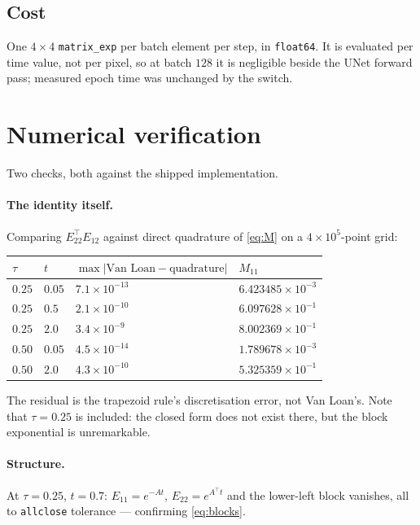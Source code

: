 \documentclass[11pt]{article}
\newcommand{\tauu}{\tau}
\begin{document}
\subsection{Cost}

One $4\times4$ \texttt{matrix\_exp} per batch element per step, in \texttt{float64}. It is
evaluated per time value, not per pixel, so at batch $128$ it is negligible beside the UNet
forward pass; measured epoch time was unchanged by the switch.

\section{Numerical verification}

Two checks, both against the shipped implementation.

\paragraph{The identity itself.} Comparing $E_{22}^{\!\top}E_{12}$ against direct
quadrature of \eqref{eq:M} on a $4\times10^{5}$-point grid:

\begin{center}
\begin{tabular}{llll}
\toprule
$\tauu$ & $t$ & $\max\big|\text{Van Loan}-\text{quadrature}\big|$ & $M_{11}$\\
\midrule
$0.25$ & $0.05$ & $7.1\times10^{-13}$ & $6.423485\times10^{-3}$\\
$0.25$ & $0.5$  & $2.1\times10^{-10}$ & $6.097628\times10^{-1}$\\
$0.25$ & $2.0$  & $3.4\times10^{-9}$  & $8.002369\times10^{-1}$\\
$0.50$ & $0.05$ & $4.5\times10^{-14}$ & $1.789678\times10^{-3}$\\
$0.50$ & $2.0$  & $4.3\times10^{-10}$ & $5.325359\times10^{-1}$\\
\bottomrule
\end{tabular}
\end{center}

\noindent
The residual is the trapezoid rule's discretisation error, not Van Loan's. Note that
$\tauu=0.25$ is included: the closed form does not exist there, but the block exponential
is unremarkable.

\paragraph{Structure.} At $\tauu=0.25$, $t=0.7$: $E_{11}=e^{-At}$, $E_{22}=e^{A^{\!\top}\!t}$
and the lower-left block vanishes, all to \texttt{allclose} tolerance --- confirming
\eqref{eq:blocks}.
\end{document}
